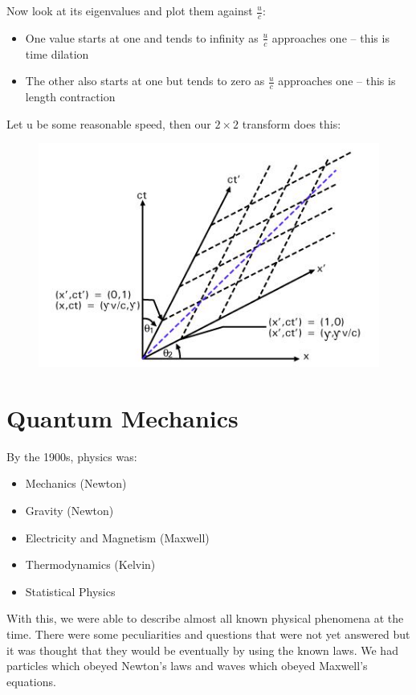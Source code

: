 \documentclass[a4paper, 11pt, normalem]{report}
\begin{document}
Now look at its eigenvalues and plot them against $\frac{u}{c}$:
\begin{itemize}
    \item One value starts at one and tends to infinity as $\frac{u}{c}$ approaches one -- this is time dilation
    \item The other also starts at one but tends to zero as $\frac{u}{c}$ approaches one -- this is length contraction
\end{itemize}
Let u be some reasonable speed, then our $2\times2$ transform does this:
\begin{figure}[H]
    \centering
    \includegraphics{Lorentz.jpg}
\end{figure}

\chapter{Quantum Mechanics}
By the 1900s, physics was:
\begin{itemize}
    \item Mechanics (Newton)
    \item Gravity (Newton)
    \item Electricity and Magnetism (Maxwell)
    \item Thermodynamics (Kelvin)
    \item Statistical Physics
\end{itemize}
With this, we were able to describe almost all known physical phenomena at the time.
There were some peculiarities and questions that were not yet answered but it was thought that they would be eventually by using the known laws.
We had particles which obeyed Newton's laws and waves which obeyed Maxwell's equations.
\end{document}
